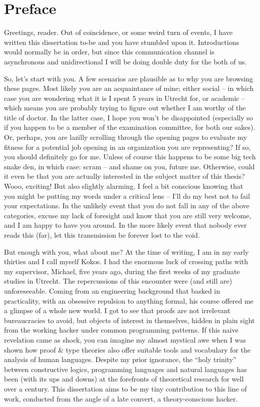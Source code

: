 \chapter*{Preface}

Greetings, reader. Out of coincidence, or some weird turn of events, I have written this dissertation to-be and you have stumbled upon it.
Introductions would normally be in order, but since this communication channel is asynchronous and unidirectional I will be doing double duty for the both of us.

So, let's start with you. 
A few scenarios are plausible as to why you are browsing these pages. 
Most likely you are an acquaintance of mine; either social – in which case you are wondering what it is I spent 5 years in Utrecht for, or academic – which means you are probably trying to figure out whether I am worthy of the title of doctor. 
In the latter case, I hope you won’t be disappointed (especially so if you happen to be a member of the examination committee, for both our sakes).
Or, perhaps, you are lazilly scrolling through the opening pages to evaluate my fitness for a potential job opening in an organization you are representing? 
If so, you should definitely go for me.
Unless of course this happens to be some big tech snake den, in which case: scram -- and shame on you, future me.
Otherwise, could it even be that you are actually interested in the subject matter of this thesis? 
Wooo, exciting!
But also slightly alarming.
I feel a bit conscious knowing that you might be putting my words under a critical lens – I’ll do my best not to fail your expectations. 
In the unlikely event that you do not fall in any of the above categories, excuse my lack of foresight and know that you are still very welcome, and I am happy to have you around. 
In the more likely event that nobody ever reads this (far), let this transmission be forever lost to the void.

But enough with you, what about me? 
At the time of writing, I am in my early thirties and I call myself Kokos. 
I had the enormous luck of crossing paths with my supervisor, Michael, five years ago, during the first weeks of my graduate studies in Utrecht. 
The repercussions of this encounter were (and still are) unforeseeable. 
Coming from an engineering background that basked in practicality, with an obsessive repulsion to anything formal, his course offered me a glimpse of a whole new world. 
I got to see that proofs are not irrelevant bureaucracies to avoid, but objects of interest in themselves, hidden in plain sight from the working hacker under common programming patterns. 
If this naive revelation came as shock, you can imagine my almost mystical awe when I was shown how proof \& type theories also offer suitable tools and vocabulary for the analysis of human languages. 
Despite my prior ignorance, the “holy trinity” between constructive logics, programming languages and natural languages has been (with its ups and downs) at the forefronts of theoretical research for well over a century. 
This dissertation aims to be my tiny contribution to this line of work, conducted from the angle of a late convert, a theory-conscious hacker. 

